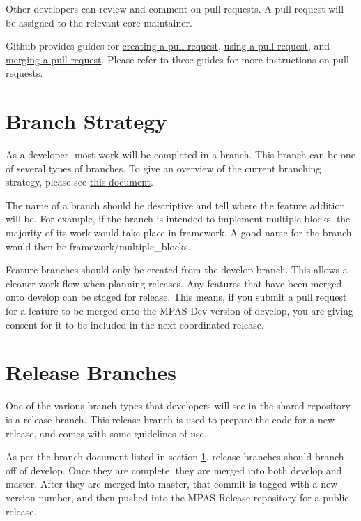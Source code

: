 \documentclass[11pt]{report}
\begin{document}
Other developers can review and comment on pull requests. A pull request will
be assigned to the relevant core maintainer.

Github provides guides for
\href{https://help.github.com/articles/creating-a-pull-request}{creating a pull
request}, \href{https://help.github.com/articles/using-pull-requests}{using a
pull request}, and
\href{https://help.github.com/articles/merging-a-pull-request}{merging a pull
request}. Please refer
to these guides for more instructions on pull requests.

\section{Branch Strategy}
\label{sec:branches}
As a developer, most work will be completed in a branch. This branch can be one
of several types of branches. To give an overview of the current branching
strategy, please see
\href{http://nvie.com/posts/a-successful-git-branching-model/}{this document}. 

The name of a branch should be descriptive and tell where the feature addition
will be. For example, if the branch is intended to implement multiple blocks,
the majority of its work would take place in framework. A good name for the
branch would then be framework/multiple\_blocks.

Feature branches should only be created from the develop branch. This allows a
cleaner work flow when planning releases. Any features that have been merged
onto develop can be staged for release. This means, if you submit a pull
request for a feature to be merged onto the MPAS-Dev version of develop, you
are giving consent for it to be included in the next coordinated release.

\section{Release Branches}
\label{sec:release-branches}
One of the various branch types that developers will see in the shared
repository is a release branch. This release branch is used to prepare the code
for a new release, and comes with some guidelines of use.

As per the branch document listed in section \ref{sec:branches}, release
branches should branch off of develop. Once they are complete, they are merged
into both develop and master. After they are merged into master, that commit is
tagged with a new version number, and then pushed into the MPAS-Release
repository for a public release.
\end{document}
